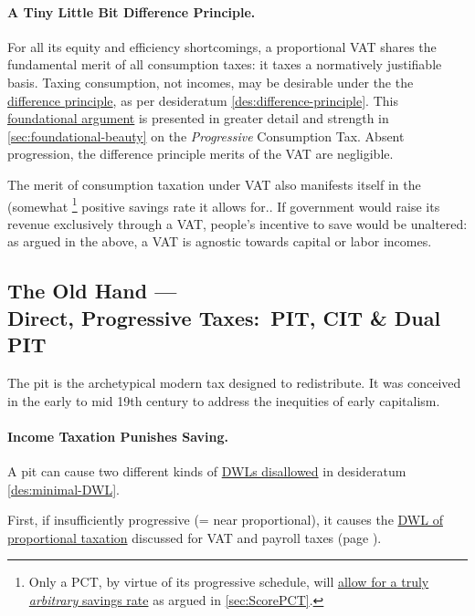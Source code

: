 \paragraph{A Tiny Little Bit Difference Principle.}
For all its equity and efficiency shortcomings, a proportional VAT shares the fundamental merit of all consumption taxes:
it taxes a normatively justifiable basis.
Taxing consumption, not incomes, may be desirable under the the \hyperref[des:difference-principle]{difference principle}, as per desideratum \ref{des:difference-principle}.
This \hyperref[sec:foundational-beauty]{foundational argument} is presented in greater detail and strength in \ref{sec:foundational-beauty} on the \emph{Progressive} Consumption Tax.
Absent progression, the difference principle merits of the VAT are negligible.

The merit of consumption taxation under VAT also manifests itself in the (somewhat
\footnote{
	Only a PCT, by virtue of its progressive schedule, will \hyperref[sec:ScorePCT]{allow for a truly \emph{arbitrary} savings rate} as argued in \autoref{sec:ScorePCT}.
}
positive savings rate it allows for..
If government would raise its revenue exclusively through a VAT, people's incentive to save would be unaltered:
as argued in the above, a VAT is agnostic towards capital or labor incomes.

\subsection[Direct, Progressive Taxes]{The Old Hand ---\\Direct, Progressive Taxes:~PIT, CIT \& Dual PIT}
	\label{sec:ScorePIT}
The \gls{pit} is the archetypical modern tax designed to redistribute.
It was conceived in the early to mid 19th century to address the inequities of early capitalism.

\paragraph{Income Taxation Punishes Saving.}
A \gls{pit} can cause two different kinds of \hyperref[des:minimal-DWL]{DWLs disallowed} in desideratum \ref{des:minimal-DWL}.

First, if insufficiently progressive (= near proportional), it causes the \hyperref[sec:PropTaxDWL]{DWL of proportional taxation} discussed for VAT and payroll taxes (page \pageref{sec:PropTaxDWL}).

